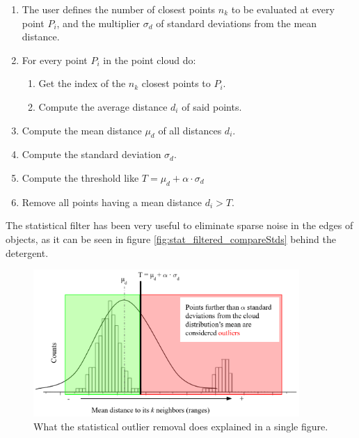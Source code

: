 \documentclass[../main.tex]{subfiles}
\begin{document}
\begin{enumerate}
    \item The user defines the number of closest points $n_{k}$ to be evaluated at every point $P_{i}$, and the multiplier $\sigma_{d}$ of standard deviations from the mean distance.
    \item For every point $P_{i}$ in the point cloud do:
    \begin{enumerate}
        \item Get the index of the $n_{k}$ closest points to $P_{i}$.
        \item Compute the average distance $d_{i}$ of said points.
    \end{enumerate}
    \item Compute the mean distance $\mu_{d}$ of all distances $d_{i}$.
    \item Compute the standard deviation $\sigma_{d}$.
    \item Compute the threshold like $T=\mu_{d} + \alpha \cdot \sigma_{d}$
    \item Remove all points having a mean distance $d_{i} > T$.
\end{enumerate}

The statistical filter has been very useful to eliminate sparse noise in the edges of objects, as it can be seen in figure \ref{fig:stat_filtered_compareStds} behind the detergent.

\begin{figure}[htbp]
    \centering
    \includegraphics[width=0.9\textwidth]{images/stat_filter_diagram.png}
    \caption{What the statistical outlier removal does explained in a single figure.}
    \label{fig:stat_filter_diagram}
\end{figure}
\end{document}
